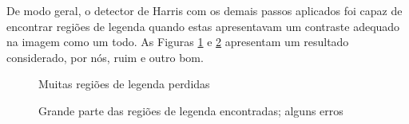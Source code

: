\documentclass[12pt]{article}
\begin{document}
De modo geral, o detector de Harris com os demais passos aplicados
foi capaz de encontrar regiões de legenda quando estas apresentavam um
contraste adequado na imagem como um todo. As Figuras
\ref{lowcontrast} e \ref{highcontrast} apresentam um resultado
considerado, por nós, ruim e outro bom.

\begin{figure}[h!]
  \centering
  \quad
  \caption{Muitas regiões de legenda perdidas\label{lowcontrast}}
\end{figure}

\begin{figure}[h!]
  \centering
  \quad
  \caption{Grande parte das regiões de legenda encontradas; alguns
    erros\label{highcontrast}}
\end{figure}
\end{document}
